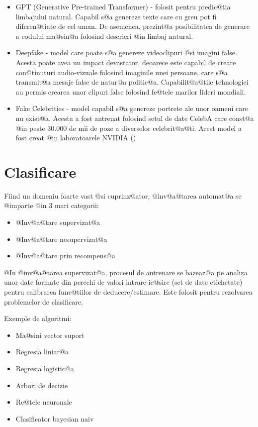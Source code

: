 \begin{itemize}
	\item GPT (Generative Pre-trained Transformer) - folosit pentru predic@tia limbajului na\-tu\-ral. Capabil s@a genereze texte care cu greu pot fi diferen@tiate de cel uman. De asemenea, prezint@a posibilitatea de generare a codului ma@sin@a folosind descrieri @in limbaj na\-tu\-ral.
	\item Deepfake - model care poate s@a genereze videoclipuri @si imagini false. Acesta poate avea un impact devastator, deoarece este capabil de creare con@tinuturi audio-vizuale folosind imaginile unei persoane, care s@a transmit@a mesaje false de natur@a politic@a. Capabilit@a@tile tehnologiei au permis crearea unor clipuri false folosind fe@tele marilor lideri mondiali.
	\item Fake Celebrities - model capabil s@a genereze portrete ale unor oameni care nu exist@a. Acesta a fost antrenat folosind setul de date CelebA care const@a @in peste 30.000 de mii de poze a diverselor celebrit@a@ti. Acest model a fost creat @in laboratoarele NVIDIA 
	(\cite{nvidia-gan})  
\end{itemize}
 
\section{Clasificare}

Fiind un domeniu foarte vast @si cuprinz@ator, @inv@a@tarea automat@a se @imparte @in 3 mari categorii:
\hspace{0.2cm}
\begin{itemize}
	\item @Inv@a@tare supervizat@a
	\item @Inv@a@tare nesupervizat@a
	\item @Inv@a@tare prin recompens@a
\end{itemize}

\vspace{0.3cm}
@In @inv@a@tarea supervizat@a, procesul de antrenare se bazeaz@a pe analiza unor date formate din perechi de valori intrare-ie@sire (set de date etichetate) pentru calibrarea func@tiilor de deducere/estimare. Este folosit pentru rezolvarea problemelor de clasificare.

Exemple de algoritmi:
\begin{itemize}
	\item Ma@sini vector suport
	\item Regresia liniar@a
	\item Regresia logistic@a
	\item Arbori de decizie
	\item Re@tele neuronale
	\item Clasificator bayesian naiv
\end{itemize}

